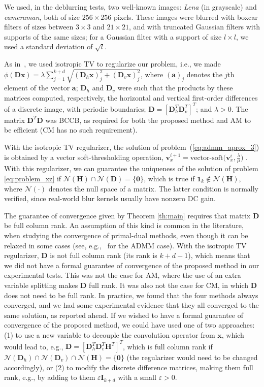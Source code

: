 \documentclass[10pt,twocolumn,twoside]{IEEEtran}
\newcommand{\Hm}{\mathbf{H}} %
\newcommand{\x}{\mathbf{x}} %
\newcommand{\vs}{\mathbf{v}} %
\newcommand{\D}{\mathbf{D}} %
\newcommand{\I}{\mathbf{I}} %
\begin{document}
We used, in the deblurring tests, two well-known images: \textit{Lena} (in grayscale) and \textit{cameraman}, both of size $256 \times 256$ pixels. These images were blurred with boxcar filters of sizes between $3 \times 3$ and $21 \times 21$, and with truncated Gaussian filters with supports of the same sizes; for a Gaussian filter with a support of size $l \times l$, we used a standard deviation of $\sqrt{l}$.

As in~\cite{Almeida2013a, Matakos2013, Condat2014}, we used isotropic TV to regularize our problem, i.e., we made $\phi(\D \x) = \lambda \sum_{j = 1}^{k + d} \sqrt{(\D_h \x)_j^2 + (\D_v \x)_j^2}$, where $(\mathbf{a})_{j}$ denotes the $j$th element of the vector $\mathbf{a}$; $\D_h$ and $\D_v$ were such that the products by these matrices computed, respectively, the horizontal and vertical first-order differences of a discrete image, with periodic boundaries; $\D = [\D_h^T \D_v^T]^T$; and $\lambda > 0$. The matrix $\D^T \D$ was BCCB, as required for both the proposed method and AM to be efficient (CM has no such requirement).

With the isotropic TV regularizer, the solution of problem~(\ref{eq:admm_aprox_3}) is obtained by a vector soft-thresholding operation, $\vs_x^{i+1} = \text{vector-soft} \big( \vs_x^i, \frac{\lambda}{\mu} \big)$ \cite{Wang2008, Donoho1995}. With this regularizer, we can guarantee the uniqueness of the solution of problem \eqref{eq:problem_xz} if $\mathcal{N}(\Hm) \cap \mathcal{N}(\D) = \{\mathbf 0\}$, which is true if $\textbf{1}_k \notin \mathcal{N}(\Hm)$, where $\mathcal{N}(\cdot)$ denotes the null space of a matrix. The latter condition is normally verified, since real-world blur kernels usually have nonzero DC gain.

The guarantee of convergence given by Theorem \ref{th:main} requires that matrix $\D$ be full column rank. An assumption of this kind is common in the literature, when studying the convergence of primal-dual methods, even though it can be relaxed in some cases (see, e.g.,~\cite{Boyd2011} for the ADMM case). With the isotropic TV regularizer, $\D$ is not full column rank (its rank is $k+d-1$), which means that we did not have a formal guarantee of convergence of the proposed method in our experimental tests. This was not the case for AM, where the use of an extra variable splitting makes $\D$ full rank. It was also not the case for CM, in which $\D$ does not need to be full rank. In practice, we found that the four methods always converged, and we had some experimental evidence that they all converged to the same solution, as reported ahead. If we wished to have a formal guarantee of convergence of the proposed method, we could have used one of two approaches: (1) to use a new variable to decouple the convolution operator from $\x$, which would lead to, e.g., $\D = [\D_h^T \D_v^T \Hm^T]^T$, which is full column rank if $\mathcal{N}(\D_h) \cap \mathcal{N}(\D_v) \cap \mathcal{N}(\Hm) = \{\mathbf{0}\}$ (the regularizer would need to be changed accordingly), or (2) to modify the discrete difference matrices, making them full rank, e.g., by adding to them $\varepsilon \I_{k+d}$ with a small $\varepsilon > 0$.
\end{document}

